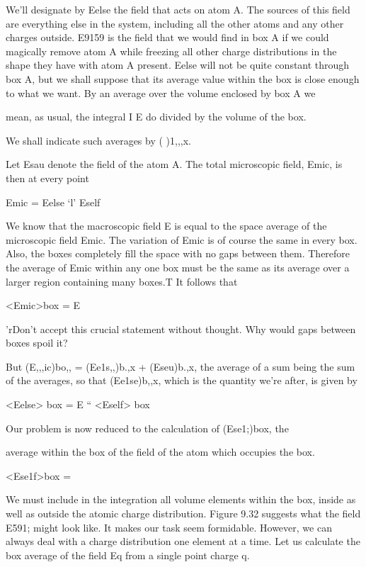 {{{We'll designate by Eelse the field that acts on atom A. The sources
of this field are everything else in the system, including all the other
atoms and any other charges outside. E9159 is the field that we would
find in box A if we could magically remove atom A while freezing all
other charge distributions in the shape they have with atom A
present. Eelse will not be quite constant through box A, but we shall
suppose that its average value within the box is close enough to what
we want. By an average over the volume enclosed by box A we

mean, as usual, the integral I E do divided by the volume of the box.

We shall indicate such averages by ( )1,,,x.

Let Esau denote the field of the atom A. The total microscopic
field, Emic, is then at every point

Emic = Eelse ‘l' Eself 

We know that the macroscopic field E is equal to the space average
of the microscopic field Emic. The variation of Emic is of course the
same in every box. Also, the boxes completely fill the space with
no gaps between them. Therefore the average of Emic within any
one box must be the same as its average over a larger region containing
many boxes.T It follows that

<Emic>box = E 

'rDon't accept this crucial statement without thought. Why would gaps between
boxes spoil it?

But (E,,,ic)bo,, = (Ee1s,,)b.,x + (Eseu)b.,x, the average of a sum being
the sum of the averages, so that (Ee1se)b,,x, which is the quantity we're
after, is given by

\begin{equation}
\end{equation}
<Eelse> box = E `` <Eself> box 

Our problem is now reduced to the calculation of (Ese1;)box, the

average within the box of the field of the atom which occupies the
box.

\begin{equation}
\end{equation}
<Ese1f>box = %

We must include in the integration all volume elements within the
box, inside as well as outside the atomic charge distribution. Figure
9.32 suggests what the field E591; might look like. It makes our task
seem formidable. However, we can always deal with a charge distribution
one element at a time. Let us calculate the box average
of the field Eq from a single point charge q.

}}}
